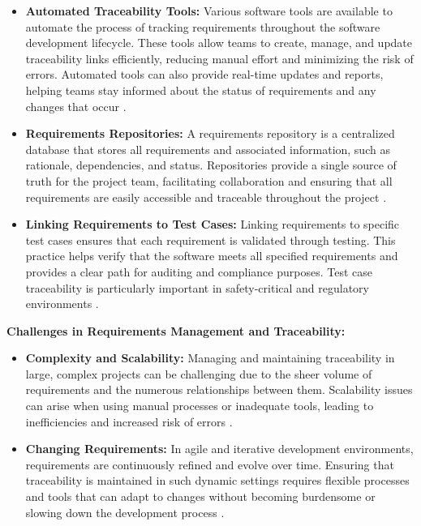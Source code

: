 \begin{refsection}
\begin{itemize}
    \item \textbf{Automated Traceability Tools:} Various software tools are available to automate the process of tracking requirements throughout the software development lifecycle. These tools allow teams to create, manage, and update traceability links efficiently, reducing manual effort and minimizing the risk of errors. Automated tools can also provide real-time updates and reports, helping teams stay informed about the status of requirements and any changes that occur \cite[pp.~240-260]{wiegers2013software}.
    
    \item \textbf{Requirements Repositories:} A requirements repository is a centralized database that stores all requirements and associated information, such as rationale, dependencies, and status. Repositories provide a single source of truth for the project team, facilitating collaboration and ensuring that all requirements are easily accessible and traceable throughout the project \cite[pp.~320-340]{wiegers2013software}.
    
    \item \textbf{Linking Requirements to Test Cases:} Linking requirements to specific test cases ensures that each requirement is validated through testing. This practice helps verify that the software meets all specified requirements and provides a clear path for auditing and compliance purposes. Test case traceability is particularly important in safety-critical and regulatory environments \cite[pp.~195-210]{sommerville2016software}.
\end{itemize}

\textbf{Challenges in Requirements Management and Traceability:}

\begin{itemize}
    \item \textbf{Complexity and Scalability:} Managing and maintaining traceability in large, complex projects can be challenging due to the sheer volume of requirements and the numerous relationships between them. Scalability issues can arise when using manual processes or inadequate tools, leading to inefficiencies and increased risk of errors \cite[pp.~190-210]{pohl2010requirements}.
    
    \item \textbf{Changing Requirements:} In agile and iterative development environments, requirements are continuously refined and evolve over time. Ensuring that traceability is maintained in such dynamic settings requires flexible processes and tools that can adapt to changes without becoming burdensome or slowing down the development process \cite[pp.~175-190]{leffingwell2011agile}.
    

\end{itemize}
\end{refsection}
